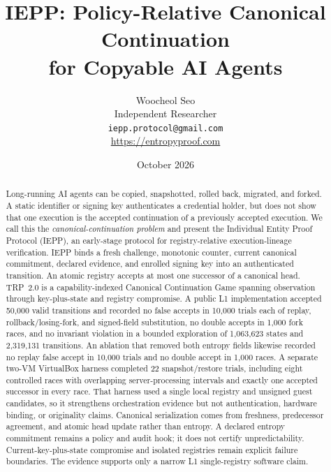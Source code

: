 \documentclass[11pt]{article}
\title{IEPP: Policy-Relative Canonical Continuation\\for Copyable AI Agents}
\author{Woocheol Seo\\Independent Researcher\\\texttt{iepp.protocol@gmail.com}\\\url{https://entropyproof.com}}
\date{October 2026}
\newcommand{\iepp}{\textsc{IEPP}}
\begin{document}
\maketitle

\begin{abstract}
Long-running AI agents can be copied, snapshotted, rolled back, migrated, and forked. A static identifier or signing key authenticates a credential holder, but does not show that one execution is the accepted continuation of a previously accepted execution. We call this the \emph{canonical-continuation problem} and present the Individual Entity Proof Protocol (\iepp), an early-stage protocol for registry-relative execution-lineage verification. \iepp{} binds a fresh challenge, monotonic counter, current canonical commitment, declared evidence, and enrolled signing key into an authenticated transition. An atomic registry accepts at most one successor of a canonical head. TRP~2.0 is a capability-indexed Canonical Continuation Game spanning observation through key-plus-state and registry compromise. A public L1 implementation accepted 50,000 valid transitions and recorded no false accepts in 10,000 trials each of replay, rollback/losing-fork, and signed-field substitution, no double accepts in 1,000 fork races, and no invariant violation in a bounded exploration of 1,063,623 states and 2,319,131 transitions. An ablation that removed both entropy fields likewise recorded no replay false accept in 10,000 trials and no double accept in 1,000 races. A separate two-VM VirtualBox harness completed 22 snapshot/restore trials, including eight controlled races with overlapping server-processing intervals and exactly one accepted successor in every race. That harness used a single local registry and unsigned guest candidates, so it strengthens orchestration evidence but not authentication, hardware binding, or originality claims. Canonical serialization comes from freshness, predecessor agreement, and atomic head update rather than entropy. A declared entropy commitment remains a policy and audit hook; it does not certify unpredictability. Current-key-plus-state compromise and isolated registries remain explicit failure boundaries. The evidence supports only a narrow L1 single-registry software claim.
\end{abstract}
\end{document}
